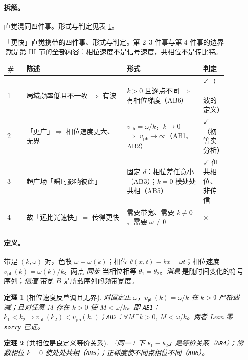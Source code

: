 \documentclass[aps,prd,preprint,superscriptaddress,amsmath,amssymb]{revtex4-2}
\newtheorem{theorem}{定理}[section]
\begin{document}
\paragraph{拆解。}
直觉混同四件事。形式与判定见表 \ref{tab:claims}。

\begin{table}[ht]
\caption{「更快」直觉携带的四件事、形式与判定。第 2--3 件事与第 4 件事的边界就是第 III 节的全部内容：相位速度不是信号速度，共相位不是传比特。}
\label{tab:claims}
\begin{ruledtabular}
\begin{tabular}{p{0.08\linewidth}p{0.42\linewidth}p{0.32\linewidth}p{0.08\linewidth}}
\# & 陈述 & 形式 & 判定 \\
\hline
1 & 局域频率低且不一致 $\Rightarrow$ 有波 & $k>0$ 且逐点不同 $\Rightarrow$ 有相位梯度（AB6） & $\checkmark$（$=$ 波的定义）\\
2 & 「更广」$\Rightarrow$ 相位速度更大、无界 & $v_{\mathrm{ph}}=\omega/k$，$k\to0^{+}$ $\Rightarrow$ $v_{\mathrm{ph}}\to\infty$（AB1、AB2） & $\checkmark$（初等实分析）\\
3 & 超广场「瞬时影响彼此」 & 固定 $d$：相位差任意小（AB3）；$k=0$ 模处处共相（AB5） & $\checkmark$ 但共相位、非传信\\
4 & 故「远比光速快」$=$ 传得更快 & 需要带宽、需要 $k\ne0$、需要 $\omega\ne0$ & $\times$\\
\end{tabular}
\end{ruledtabular}
\end{table}

\paragraph{定义。}
带是 $(k,\omega)$ 对，色散 $\omega=\omega(k)$；相位 $\theta(x,t)=kx-\omega t$；相位速度 $v_{\mathrm{ph}}(k)=\omega(k)/k$。两点 \emph{同步} 当相位相等 $\theta_1=\theta_2$。\emph{消息} 是随时间变化的符号序列；\emph{信道} 带宽 $B$ 是所载序列的频带宽度。

\begin{theorem}[相位速度反单调且无界]
\label{thm:ab1}
对固定正 $\omega$，$v_{\mathrm{ph}}(k)=\omega/k$ 在 $k>0$ 严格递减；且对任意 $M$ 存在 $k>0$ 使 $M<\omega/k$。即 \texttt{AB1}：$k_1<k_2 \Rightarrow v_{\mathrm{ph}}(k_2)<v_{\mathrm{ph}}(k_1)$；\texttt{AB2}：$\forall M\,\exists k>0,\ M<\omega/k$。两者 Lean 零 \texttt{sorry} 已证。
\end{theorem}

\begin{theorem}[共相位是良定义等价关系]
\label{thm:ab4}
「同一 $t$ 下 $\theta_1=\theta_2$」是等价关系（\texttt{AB4}）；常数相位 $k=0$ 使处处共相（\texttt{AB5}）；正梯度使不同点相位不同（\texttt{AB6}）。
\end{theorem}
\end{document}
